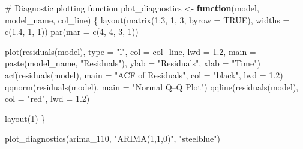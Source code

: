 \documentclass[
  11pt,
]{article}
\newenvironment{Shaded}{\begin{snugshade}}{\end{snugshade}}
\newcommand{\AttributeTok}[1]{\textcolor[rgb]{0.40,0.45,0.13}{#1}}
\newcommand{\CommentTok}[1]{\textcolor[rgb]{0.37,0.37,0.37}{#1}}
\newcommand{\ConstantTok}[1]{\textcolor[rgb]{0.56,0.35,0.01}{#1}}
\newcommand{\ControlFlowTok}[1]{\textcolor[rgb]{0.00,0.23,0.31}{\textbf{#1}}}
\newcommand{\DecValTok}[1]{\textcolor[rgb]{0.68,0.00,0.00}{#1}}
\newcommand{\FloatTok}[1]{\textcolor[rgb]{0.68,0.00,0.00}{#1}}
\newcommand{\FunctionTok}[1]{\textcolor[rgb]{0.28,0.35,0.67}{#1}}
\newcommand{\NormalTok}[1]{\textcolor[rgb]{0.00,0.23,0.31}{#1}}
\newcommand{\OtherTok}[1]{\textcolor[rgb]{0.00,0.23,0.31}{#1}}
\newcommand{\SpecialCharTok}[1]{\textcolor[rgb]{0.37,0.37,0.37}{#1}}
\newcommand{\StringTok}[1]{\textcolor[rgb]{0.13,0.47,0.30}{#1}}
\begin{document}
\begin{Shaded}
\begin{Highlighting}[]
\CommentTok{\# Diagnostic plotting function}
\NormalTok{plot\_diagnostics }\OtherTok{\textless{}{-}} \ControlFlowTok{function}\NormalTok{(model, model\_name, col\_line) \{}
  \FunctionTok{layout}\NormalTok{(}\FunctionTok{matrix}\NormalTok{(}\DecValTok{1}\SpecialCharTok{:}\DecValTok{3}\NormalTok{, }\DecValTok{1}\NormalTok{, }\DecValTok{3}\NormalTok{, }\AttributeTok{byrow =} \ConstantTok{TRUE}\NormalTok{), }\AttributeTok{widths =} \FunctionTok{c}\NormalTok{(}\FloatTok{1.4}\NormalTok{, }\DecValTok{1}\NormalTok{, }\DecValTok{1}\NormalTok{))}
  \FunctionTok{par}\NormalTok{(}\AttributeTok{mar =} \FunctionTok{c}\NormalTok{(}\DecValTok{4}\NormalTok{, }\DecValTok{4}\NormalTok{, }\DecValTok{3}\NormalTok{, }\DecValTok{1}\NormalTok{))}
  
  \FunctionTok{plot}\NormalTok{(}\FunctionTok{residuals}\NormalTok{(model), }\AttributeTok{type =} \StringTok{"l"}\NormalTok{, }\AttributeTok{col =}\NormalTok{ col\_line, }\AttributeTok{lwd =} \FloatTok{1.2}\NormalTok{,}
       \AttributeTok{main =} \FunctionTok{paste}\NormalTok{(model\_name, }\StringTok{"Residuals"}\NormalTok{), }\AttributeTok{ylab =} \StringTok{"Residuals"}\NormalTok{, }\AttributeTok{xlab =} \StringTok{"Time"}\NormalTok{)}
  \FunctionTok{acf}\NormalTok{(}\FunctionTok{residuals}\NormalTok{(model), }\AttributeTok{main =} \StringTok{"ACF of Residuals"}\NormalTok{, }\AttributeTok{col =} \StringTok{"black"}\NormalTok{, }\AttributeTok{lwd =} \FloatTok{1.2}\NormalTok{)}
  \FunctionTok{qqnorm}\NormalTok{(}\FunctionTok{residuals}\NormalTok{(model), }\AttributeTok{main =} \StringTok{"Normal Q–Q Plot"}\NormalTok{)}
  \FunctionTok{qqline}\NormalTok{(}\FunctionTok{residuals}\NormalTok{(model), }\AttributeTok{col =} \StringTok{"red"}\NormalTok{, }\AttributeTok{lwd =} \FloatTok{1.2}\NormalTok{)}
  
  \FunctionTok{layout}\NormalTok{(}\DecValTok{1}\NormalTok{)}
\NormalTok{\}}

\FunctionTok{plot\_diagnostics}\NormalTok{(arima\_110, }\StringTok{"ARIMA(1,1,0)"}\NormalTok{, }\StringTok{"steelblue"}\NormalTok{)}
\end{Highlighting}
\end{Shaded}
\end{document}

